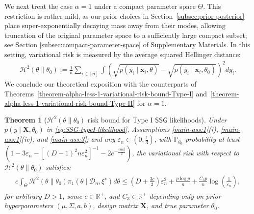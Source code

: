 \documentclass[12pt]{article}
\newtheorem{theorem}{Theorem}
\numberwithin{equation}{section}
\begin{document}
We next treat the case $\alpha=1$ under a compact parameter space $\Theta$. This restriction is rather mild, as our prior choices in Section~\ref{subsec:prior-posterior} place super-exponentially decaying mass away from their modes, allowing truncation of the original parameter space to a sufficiently large compact subset; see Section \ref{subsec:compact-parameter-space} of Supplementary Materials. In this setting, variational risk is measured by the average squared Hellinger distance:
%
\begin{align}\label{eq:Hellinger-divergence}
    \mathcal{H}^{2}(\theta \parallel \theta_0) := \frac{1}{n}\sum_{i\in [n]}\int \left(\sqrt{p(y_i\mid \mathbf{x}_i, \theta)} - \sqrt{p(y_i\mid \mathbf{x}_i, \theta_0)}\right)^2dy_i.
\end{align}
%
We conclude our theoretical exposition with the counterparts of Theorems~\ref{theorem-alpha-less-1-variational-risk-bound-Type-I} and~\ref{theorem-alpha-less-1-variational-risk-bound-Type-II} for $\alpha = 1$. 
%
\begin{theorem}[$\mathcal{H}^{2}(\theta \parallel \theta_0)$ risk bound for Type I $\mathsf{SSG}$ likelihoods]
\label{theorem-alpha-equals-1-variational-risk-bound-Type-I}
%
Under $p(y\mid \mathbf{X}, \theta_0)$ in \eqref{eq:SSG-typeI-likelihood}, Assumptions \ref{main-ass:1}(i), \ref{main-ass:1}(iv), and \ref{main-ass:3}; and any $\varepsilon _n\in \left(0, \frac{1}{3}\right)$, with $\mathbb{P}_{\theta_0}$-probability at least $(1 - 3\varepsilon_n - [(D-1)^2n\varepsilon_n^2]^{-1} - 2e^{-\tfrac{c n \varepsilon_n^2}{2}})$, the variational risk with respect to $\mathcal{H}^{2}(\theta \parallel \theta_0)$ satisfies:
%
\begin{align}\label{eq:type-1-risk-bound-alpha-1}
    \begin{split}
    c\int_{\Theta}\mathcal{H}^{2}(\theta \parallel \theta_0) \pi_{1}(\theta\mid \mathcal{D}_n, \xi^{\star})d\theta \leq \left(D + \frac{3c}{2}\right)\varepsilon_n^2 + \frac{p\log p}{n} + \frac{C_3 p}{n}\log\left(\frac{1}{\varepsilon_n}\right),
    \end{split}
\end{align}
%
for arbitrary $D>1$, some $c\in \mathbb{R}^{+}$, and $C_3 \in \mathbb{R}^{+}$ depending only on prior hyperparameters $(\mu, \Sigma, a, b)$, design matrix $\mathbf{X}$, and true parameter $\theta_0$.
\end{theorem}
\end{document}
